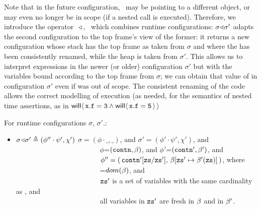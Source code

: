  Note that in the future  configuration, \x\, may be pointing to a different object, or may
even no longer be in scope (\eg if a nested call  is executed).
Therefore, we introduce the operator \  $\!\triangleleft\!\;$,  \ which combines runtime configurations: $\sigma \!\triangleleft\! \sigma'$ adapts the second configuration to the top frame's view of the former: it returns a new configuration whose stack has  the top frame as taken from $\sigma$ and where the  has been consistently renamed, while the heap is taken from $\sigma'$. This allows us to interpret expressions  in the newer (or older) configuration $\sigma'$ but with the variables bound according to the top frame from $\sigma$; \eg we can obtain that value of  in configuration  $\sigma'$ even if  was out of scope. The consistent renaming of the code allows the correct modelling of execution (as needed,   for the semantics of  nested time assertions, as \eg in ${\mathsf{will}}\langle \,{\mbox{\tt{x}}}.{\mbox{\tt{f}}}={\mbox{\tt{3}}} \wedge {\mathsf{will}}\langle \,{\mbox{\tt{x}}}.{\mbox{\tt{f}}}={\mbox{\tt{5}}}\,\rangle\,\rangle$



 \begin{definition}   \label{def:config:adapt}
 For runtime configurations $\sigma$, $\sigma'$.$:$
 $~ $ 

\begin{itemize}
\item
$\sigma \!\triangleleft\! \sigma' \triangleq (\phi''\cdot\psi',\chi')$  \IFF $\sigma=(\phi\cdot\_,\_)$, and $\sigma'= (\phi'\cdot\psi',\chi')$, and
 \\
$\ \strut \ \ \hspace{1.45in} $
$\phi$=$({\mbox{\tt{contn}}},{\beta})$, and $\phi'$=$({\mbox{\tt{contn}}}',{\beta}')$, and
 \\
$\ \strut \ \ \hspace{1.45in} $     %
  $\phi''=(\, {\mbox{\tt{contn}}}'[{\mbox{\tt{zs}}}/{\mbox{\tt{zs}}}' ],\,{\beta}[{\mbox{\tt{zs}}}'\mapsto {\ensuremath{\beta}}'({\mbox{\tt{zs}}})]\, ) $, where
 \\
$\ \strut \ \ \hspace{1.45in} $
=$dom({\beta})$, and
 \\
$\ \strut \ \ \hspace{1.45in} $      ${\mbox{\tt{zs}}}'$ is a set  of variables with  the  same cardinality as , and
 \\
$\ \strut \ \ \hspace{1.45in} $   all variables in
${\mbox{\tt{zs}}}'$  are fresh in ${\beta}$ and in ${\beta}'$.
\end{itemize}
\end{definition}

